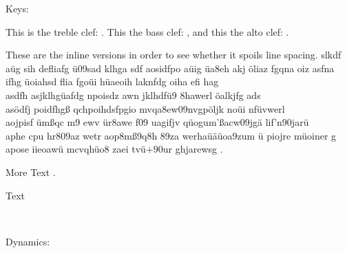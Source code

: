 \documentclass{scrartcl}
\begin{document}
	Keys:
	
	This is the treble clef: \clefG . This the bass clef: \clefF, and this the alto clef: \clefC.
	
	These are the inline versions in order to see whether it spoils line spacing. slkdf aüg sih defliafg ü09sad klhga sdf \clefGInline* aosidfpo aüig üa8eh akj öliaz fgqna oiz asfna ifhg üoiahsd flia fgoüi hüaeoih laknfdg oiha efi hag \\
	asdfh asjklhgüafdg npoisdz awn jklhdfü9 8hawerl öalkjfg ads\\
	asödfj \clefFInline poidfhgß \clefFInline* qchpoihdsfpgio mvqa8ew09nvgpöljk noüi nfüvwerl \\
	aojpisf ümßqc m9 ewv ür8awe f09 uagifjv qüogum'ßacw09jgä lif'n90jarü\\
	aphe cpu hr809az wetr \clefCInline* aop8mß9q8h 89za werhaüäüoa9zum ü piojre müoiner g\\
	apose iieoawü mcvqhüo8 zaei tvü+90ur ghjarewsg \clefCInline.
	
	\lilyTimeC*[raise=-0.4] More Text \lilyTimeCHalf.
	
	\clefF* Text
	
	
	

	 ~

	 \lilyDot[scale=1.2]
	
	
	Dynamics: 
	


\end{document}
